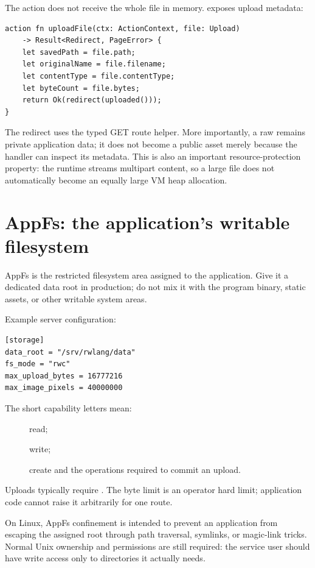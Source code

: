 \newpage
The action does not receive the whole file in memory.  exposes upload metadata:

\begin{lstlisting}[language=RWLang]
action fn uploadFile(ctx: ActionContext, file: Upload)
    -> Result<Redirect, PageError> {
    let savedPath = file.path;
    let originalName = file.filename;
    let contentType = file.contentType;
    let byteCount = file.bytes;
    return Ok(redirect(uploaded()));
}
\end{lstlisting}

The redirect uses the typed  GET route helper. More importantly, a raw  remains private application data; it does not become a public asset merely because the handler can inspect its metadata. This is also an important resource-protection property: the runtime streams multipart content, so a large file does not automatically become an equally large VM heap allocation.

\section{AppFs: the application's writable filesystem}

AppFs is the restricted filesystem area assigned to the application. Give it a dedicated data root in production; do not mix it with the program binary, static assets, or other writable system areas.

Example server configuration:

\begin{lstlisting}
[storage]
data_root = "/srv/rwlang/data"
fs_mode = "rwc"
max_upload_bytes = 16777216
max_image_pixels = 40000000
\end{lstlisting}

The short capability letters mean:

\begin{description}
  \item[] read;
  \item[] write;
  \item[] create and the operations required to commit an upload.
\end{description}

Uploads typically require . The byte limit is an operator hard limit; application code cannot raise it arbitrarily for one route.

On Linux, AppFs confinement is intended to prevent an application from escaping the assigned root through path traversal, symlinks, or magic-link tricks. Normal Unix ownership and permissions are still required: the service user should have write access only to directories it actually needs.

